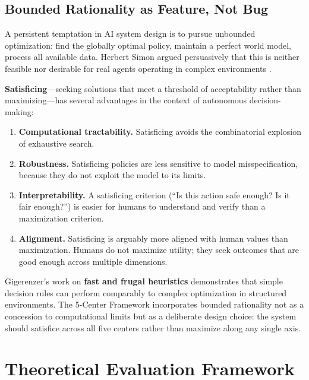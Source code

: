 \documentclass[11pt,a4paper]{article}
\begin{document}
\subsection{Bounded Rationality as Feature, Not Bug}

A persistent temptation in AI system design is to pursue unbounded optimization: find the globally optimal policy, maintain a perfect world model, process all available data. Herbert Simon argued persuasively that this is neither feasible nor desirable for real agents operating in complex environments \citep{simon1955behavioral,simon1972theories}.

\textbf{Satisficing}---seeking solutions that meet a threshold of acceptability rather than maximizing---has several advantages in the context of autonomous decision-making:

\begin{enumerate}[leftmargin=*, itemsep=2pt]
  \item \textbf{Computational tractability.} Satisficing avoids the combinatorial explosion of exhaustive search.
  \item \textbf{Robustness.} Satisficing policies are less sensitive to model misspecification, because they do not exploit the model to its limits.
  \item \textbf{Interpretability.} A satisficing criterion (``Is this action safe enough? Is it fair enough?'') is easier for humans to understand and verify than a maximization criterion.
  \item \textbf{Alignment.} Satisficing is arguably more aligned with human values than maximization. Humans do not maximize utility; they seek outcomes that are good enough across multiple dimensions.
\end{enumerate}

Gigerenzer's work on \textbf{fast and frugal heuristics} \citep{gigerenzer1999simple} demonstrates that simple decision rules can perform comparably to complex optimization in structured environments. The 5-Center Framework incorporates bounded rationality not as a concession to computational limits but as a deliberate design choice: the system should satisfice across all five centers rather than maximize along any single axis.

\section{Theoretical Evaluation Framework}
\label{sec:evaluation}
\end{document}
